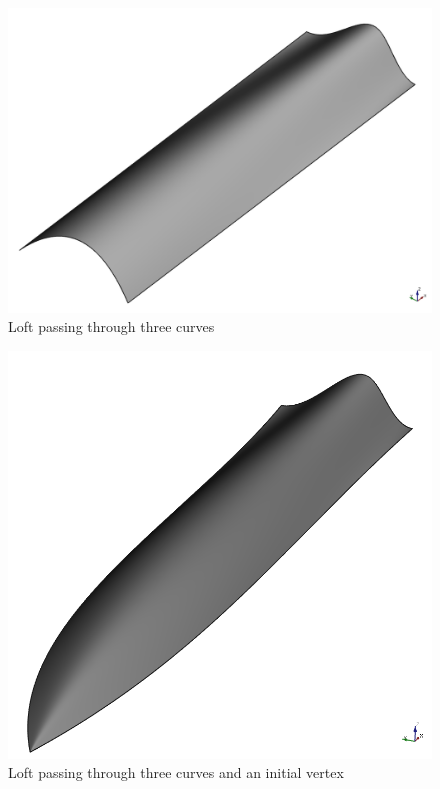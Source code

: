 %
%
\begin{figure}[!ht]
\centering
\includegraphics[scale=0.5]{Immagini/Capitolo2/ShellExample12}
\caption{Loft passing through three curves}
\label{fig:ShellExample1}
\end{figure}
%
%
\begin{figure}[!ht]
\centering
\includegraphics[scale=0.6]{Immagini/Capitolo2/ShellExample22}
\caption{Loft passing through three curves and an initial vertex}
\label{fig:ShellExample2}
\end{figure}
